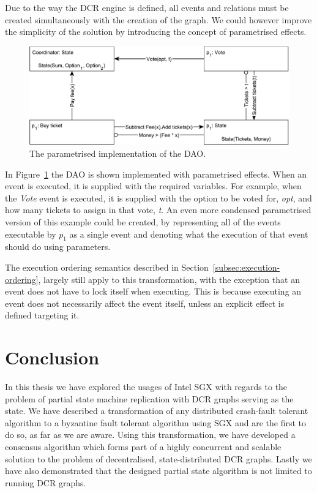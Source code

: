 \documentclass{article}
\begin{document}
	Due to the way the DCR engine is defined, all events and relations must be created simultaneously with the creation of the graph.
	We could however improve the simplicity of the solution by introducing the concept of parametrised effects.

	\begin{figure}[t]
  	\includegraphics[width=\textwidth]{figures/dcr-graphs/dao-parametrised.pdf}
	  \caption{The parametrised implementation of the DAO.}
	  \label{fig:dao-parametrised}
	\end{figure}

	In Figure~\ref{fig:dao-parametrised} the DAO is shown implemented with parametrised effects.
	When an event is executed, it is supplied with the required variables.
	For example, when the \textit{Vote} event is executed, it is supplied with the option to be voted for, \textit{opt}, and how many tickets to assign in that vote, \textit{t}.
	An even more condensed parametrised version of this example could be created, by representing all of the events executable by $p_1$ as a single event and denoting what the execution of that event should do using parameters.

	The execution ordering semantics described in Section~\ref{subsec:execution-ordering}, largely still apply to this transformation, with the exception that an event does not have to lock itself when executing.
	This is because executing an event does not necessarily affect the event itself, unless an explicit effect is defined targeting it.

	\section{Conclusion}

	In this thesis we have explored the usages of Intel SGX with regards to the problem of partial state machine replication with DCR graphs serving as the state.
	We have described a transformation of any distributed crash-fault tolerant algorithm to a byzantine fault tolerant algorithm using SGX and are the first to do so, as far as we are aware.
	Using this transformation, we have developed a consensus algorithm which forms part of a highly concurrent and scalable solution to the problem of decentralised, state-distributed DCR graphs.
	Lastly we have also demonstrated that the designed partial state algorithm is not limited to running DCR graphs.
\end{document}
